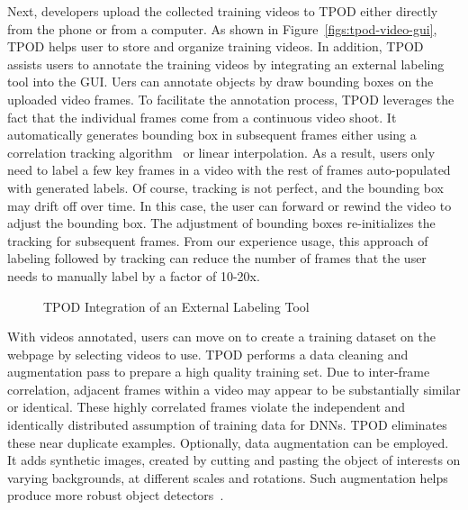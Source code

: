 Next, developers upload the collected training videos to TPOD either directly
from the phone or from a computer. As shown in Figure~\ref{figs:tpod-video-gui},
TPOD helps user to store and organize training videos. In addition, TPOD assists
users to annotate the training videos by integrating an external labeling tool
into the GUI. Uers can annotate objects by draw bounding boxes on the uploaded
video frames. To facilitate the annotation process, TPOD leverages the fact that
the individual frames come from a continuous video shoot. It automatically
generates bounding box in subsequent frames either using a correlation tracking
algorithm~\cite{danelljan2014accurate} or linear interpolation. As a result,
users only need to label a few key frames in a video with the rest of frames
auto-populated with generated labels. Of course, tracking is not perfect, and
the bounding box may drift off over time. In this case, the user can forward or
rewind the video to adjust the bounding box.  The adjustment of bounding boxes
re-initializes the tracking for subsequent frames. From our experience usage,
this approach of labeling followed by tracking can reduce the number of frames
that the user needs to manually label by a factor of 10-20x.

\begin{figure}[]
  \centering
    \caption{TPOD Integration of an External Labeling Tool}
  \label{figs:tpod-label-gui}
\end{figure}

With videos annotated, users can move on to create a training dataset on the
webpage by selecting videos to use. TPOD performs a data cleaning and
augmentation pass to prepare a high quality training set. Due to inter-frame
correlation, adjacent frames within a video may appear to be substantially
similar or identical. These highly correlated frames violate the independent and
identically distributed assumption of training data for DNNs. TPOD eliminates
these near duplicate examples. Optionally, data augmentation can be employed. It
adds synthetic images, created by cutting and pasting the object of interests on
varying backgrounds, at different scales and rotations. Such augmentation helps
produce more robust object detectors~\cite{dwibedi2017cut}.

